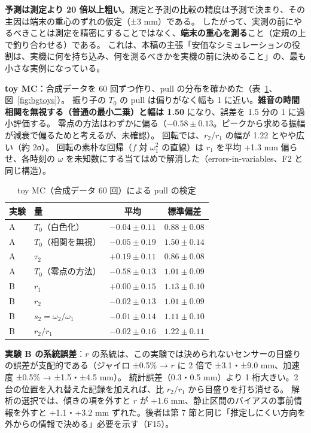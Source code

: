 \documentclass[paper=a4paper,fontsize=10pt,twocolumn,column_gap=2zw,line_length=24zw,number_of_lines=46,head_space=20mm]{jlreq}
\begin{document}
\textbf{予測は測定より 20 倍以上粗い}。測定と予測の比較の精度は予測で決まり、その主因は端末の重心のずれの仮定（±3 mm）である。
したがって、実測の前にやるべきことは測定を精密にすることではなく、\textbf{端末の重心を測る}こと（定規の上で釣り合わせる）である。
これは、本稿の主張「安価なシミュレーションの役割は、実機に何を持ち込み、何を測るべきかを実機の前に決めること」の、最も小さな実例になっている。

\textbf{toy MC}：合成データを 60 回ずつ作り、pull の分布を確かめた（表~\ref{tab:bgtoy}、図~\ref{fig:bgtoys}）。
振り子の $T_0$ の pull は偏りがなく幅も 1 に近い。\textbf{雑音の時間相関を無視する（普通の最小二乗）と幅は 1.50} になり、誤差を 1.5 分の 1 に過小評価する。
零点の方法はわずかに偏る（$-0.58\pm0.13$。ピークから求める振幅が減衰で偏るためと考えるが、未確認）。
回転では、$r_2/r_1$ の幅が 1.22 とやや広い（約 2σ）。
回転の素朴な回帰（$f$ 対 $\omega_1^2$ の直線）は $r_1$ を平均 +1.3 mm 偏らせ、各時刻の $\omega$ を未知数にする当てはめで解消した（errors-in-variables、F2 と同じ構造）。

\begin{table}[t]\centering\footnotesize
\caption{toy MC（合成データ 60 回）による pull の検定}\label{tab:bgtoy}
\setlength{\tabcolsep}{3pt}
\begin{tabular}{llcc}\toprule
実験 & 量 & 平均 & 標準偏差 \\\midrule
A & $T_0$（白色化） & $-0.04\pm0.11$ & $0.88\pm0.08$ \\
A & $T_0$（相関を無視） & $-0.05\pm0.19$ & $\mathbf{1.50\pm0.14}$ \\
A & $\tau_2$ & $+0.19\pm0.11$ & $0.86\pm0.08$ \\
A & $T_0$（零点の方法） & $\mathbf{-0.58\pm0.13}$ & $1.01\pm0.09$ \\
B & $r_1$ & $+0.00\pm0.15$ & $1.13\pm0.10$ \\
B & $r_2$ & $-0.02\pm0.13$ & $1.01\pm0.09$ \\
B & $s_2=\omega_2/\omega_1$ & $-0.01\pm0.14$ & $1.11\pm0.10$ \\
B & $r_2/r_1$ & $-0.02\pm0.16$ & $\mathbf{1.22\pm0.11}$ \\\bottomrule
\end{tabular}
\end{table}

\textbf{実験 B の系統誤差}：$r$ の系統は、この実験では決められないセンサーの目盛りの誤差が支配的である（ジャイロ ±0.5\% → $r$ に 2 倍で ±3.1・±9.0 mm、加速度 ±0.5\% → ±1.5・±4.5 mm）。
統計誤差（0.3・0.5 mm）より 1 桁大きい。2 台の位置を入れ替えた記録を加えれば、比 $r_2/r_1$ から目盛りを打ち消せる。
解析の選択では、傾きの項を外すと $r$ が +1.6 mm、静止区間のバイアスの事前情報を外すと +1.1・+3.2 mm ずれた。後者は第 7 節と同じ「推定しにくい方向を外からの情報で決める」必要を示す（F15）。
\end{document}
